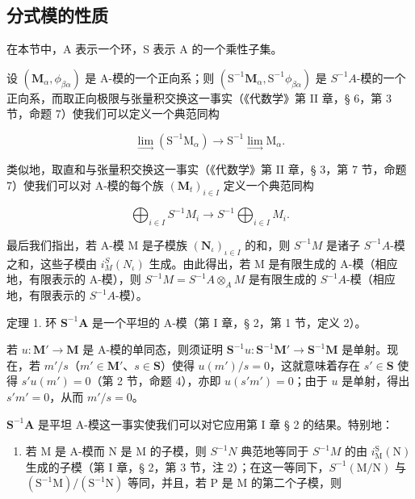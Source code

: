 \subsection{分式模的性质}

在本节中，A 表示一个环，S 表示 A 的一个乘性子集。

设 \((\mathbf{M}_{\alpha}, \phi_{\beta\alpha})\) 是 A-模的一个正向系；则 \((\mathrm{S}^{-1}\mathbf{M}_{\alpha}, \mathrm{S}^{-1}\phi_{\beta\alpha})\) 是 \(S^{-1}A\)-模的一个正向系，而取正向极限与张量积交换这一事实（《代数学》第 II 章，§ 6，第 3 节，命题 7）使我们可以定义一个典范同构

\[
\lim _ {\longrightarrow} \left(\mathrm{S} ^ {- 1} \mathrm{M} _ {\alpha}\right)\rightarrow \mathrm{S} ^ {- 1} \lim _ {\longrightarrow} \mathrm{M} _ {\alpha}.
\]

类似地，取直和与张量积交换这一事实（《代数学》第 II 章，§ 3，第 7 节，命题 7）使我们可以对 A-模的每个族 \((\mathbf{M}_t)_{i\in I}\) 定义一个典范同构

\[
\bigoplus_ {i \in I} S ^ {- 1} M _ {i} \rightarrow S ^ {- 1} \bigoplus_ {i \in I} M _ {i}.
\]

最后我们指出，若 A-模 M 是子模族 \((\mathbf{N}_{\iota})_{\iota\in I}\) 的和，则 \(S^{-1}M\) 是诸子 \(S^{-1}A\)-模之和，这些子模由 \(i_{M}^{S}(N_{\iota})\) 生成。由此得出，若 M 是有限生成的 A-模（相应地，有限表示的 A-模），则 \(S^{-1}M = S^{-1}A \otimes_{A} M\) 是有限生成的 \(S^{-1}A\)-模（相应地，有限表示的 \(S^{-1}A\)-模）。

定理 1. 环 \(\mathbf{S}^{-1}\mathbf{A}\) 是一个平坦的 A-模（第 I 章，§ 2，第 1 节，定义 2）。

若 \(u: \mathbf{M}' \to \mathbf{M}\) 是 A-模的单同态，则须证明 \(\mathbf{S}^{-1}u: \mathbf{S}^{-1}\mathbf{M}' \to \mathbf{S}^{-1}\mathbf{M}\) 是单射。现在，若 \(m'/s\)（\(m' \in \mathbf{M}'\)、\(s \in \mathbf{S}\)）使得 \(u(m')/s = 0\)，这就意味着存在 \(s' \in \mathbf{S}\) 使得 \(s'u(m') = 0\)（第 2 节，命题 4），亦即 \(u(s'm') = 0\)；由于 \(u\) 是单射，得出 \(s'm' = 0\)，从而 \(m'/s = 0\)。

\(\mathbf{S}^{-1}\mathbf{A}\) 是平坦 A-模这一事实使我们可以对它应用第 I 章 § 2 的结果。特别地：

\begin{enumerate}
\def\labelenumi{(\arabic{enumi})}
\tightlist
\item
  若 M 是 A-模而 N 是 M 的子模，则 \(S^{-1}N\) 典范地等同于 \(S^{-1}M\) 的由 \(i_{\mathrm{M}}^{\mathrm{S}}(\mathrm{N})\) 生成的子模（第 I 章，§ 2，第 3 节，注 2）；在这一等同下，\(S^{-1}(\mathrm{M}/\mathrm{N})\) 与 \((\mathrm{S}^{-1}\mathrm{M})/(\mathrm{S}^{-1}\mathrm{N})\) 等同，并且，若 P 是 M 的第二个子模，则
\end{enumerate}

